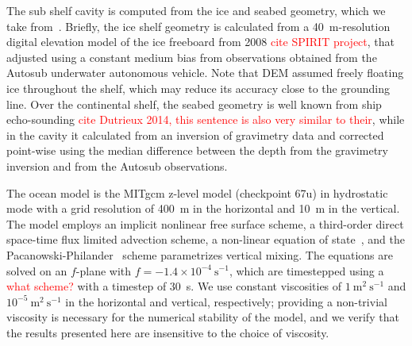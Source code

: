 \documentclass[draft]{agujournal2019}
\newcommand{\red}[1]{\textcolor{red}{#1}}
\begin{document}
The sub shelf cavity is computed from the ice and seabed geometry, which we take from~. Briefly, the ice shelf geometry is calculated from a 40~m-resolution digital elevation model of the ice freeboard from 2008 \red{cite SPIRIT project}, that adjusted using a constant medium bias from observations obtained from the Autosub underwater autonomous vehicle. Note that DEM assumed freely floating ice throughout the shelf, which may reduce its accuracy close to the grounding line. Over the continental shelf, the seabed geometry is well known from ship echo-sounding \red{cite Dutrieux 2014, this sentence is also very similar to their}, while in the cavity it calculated from an inversion of gravimetry data and corrected point-wise using the median difference between the depth from the gravimetry inversion and from the Autosub observations. 

The ocean model is the MITgcm z-level model (checkpoint 67u) in hydrostatic mode with a grid resolution of 400~m in the horizontal and 10~m in the vertical. The model employs an implicit nonlinear free surface scheme, a third-order direct space-time flux limited advection scheme, a non-linear equation of state~, and the Pacanowski-Philander~\cite{Pacanowski1981JPhysOcean} scheme parametrizes vertical mixing. The equations are solved on an $f$-plane with $f = -1.4\times10^{-4}~\text{s}^{-1}$, which are timestepped using a \red{what scheme?} with a timestep of 30~s. We use constant viscosities of $1~\text{m}^2~\text{s}^{-1}$ and $10^{-5}~\text{m}^2~\text{s}^{-1}$ in the horizontal and vertical, respectively; providing a non-trivial viscosity is necessary for the numerical stability of the model, and we verify that the results presented here are insensitive to the choice of viscosity.
\end{document}

